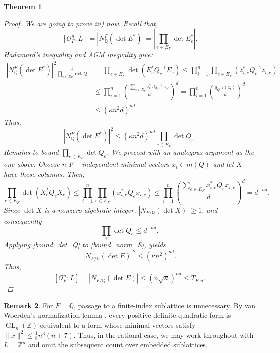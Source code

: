\documentclass[11pt,a4paper,twoside]{amsart}
\theoremstyle{plain}
\newtheorem{theorem}{\bfseries Theorem}[section]
\theoremstyle{definition}
\newtheorem{remark}[theorem]{\bfseries Remark}
\newcommand{\rint}[0]{\mathcal{O}_F}
\renewcommand{\leq}{\leqslant}
\renewcommand{\geq}{\geqslant}
\begin{document}
\begin{theorem}
\begin{proof}
We are going to prove iii) now. Recall that,
$$[\rint^n:L] = |N_{\mathbb{Q}}^F( \det E^*)| = \left|\prod_{e\in E_F} \det E_e^*\right|.$$
Hadamard's inequality and AGM inequality give:
\begin{align*}
    |N_{\mathbb{Q}}^F( \det E^*)|^2\frac{1}{\prod_{e\in E_F} \det Q} &= \prod_{e\in E_F} \det(E_e^*Q^{-1}_eE_e) \leq \prod_{i=1}^n\prod_{e\in E_F}(z_{i,e}^*Q^{-1}_ez_{i,e})\\
    &\leq \prod_{i = 1}^n \left(\frac{\sum_{e\in E_F} z_{i,e}^*Q^{-1}_ez_{i,e}}{d}\right)^d = \prod_{i=1}^n \left(\frac{q_{Q^{-1}}(z_i)}{d}\right)^d\\
    &\leq (\kappa n^2d)^{nd} 
\end{align*}
Thus,
\begin{equation}
\label{bound_norm_E}
    |N_{\mathbb{Q}}^F( \det E^*)|^2\leq (\kappa n^2d)^{nd} \prod_{e\in E_F} \det Q_e. 
\end{equation}
Remains to bound $\prod_{e\in E_F} \det Q_e$. We proceed with an analogous argument as the one above. Choose $n$ $F-$independent minimal vectors $x_i\in m(Q)$ and let $X$ have these columns. Then,
$$\prod_{e\in E_F}\det(X_e^*Q_eX_e)\leq\prod_{i=1}^n\prod_{e\in E_F}(x_{i,e}^*Q_ex_{i,e})\leq\prod_{i=1}^n\left(\frac{\sum_{e\in E_F}x_{i,e}^*Q_ex_{i,e}}{d}\right)^d=d^{-nd}.$$
Since $\det X$ is a nonzero algebraic integer, $|N_{F/\mathbb{Q}} (\det X)|\geq1$, and consequently
\begin{equation}
\label{bound_det_Q}
    \prod_e\det Q_e\leq d^{-nd}.
\end{equation}
Applying \eqref{bound_det_Q} to \eqref{bound_norm_E}, yields
 $$|N_{F/\mathbb{Q}} (\det E)|^2\leq(\kappa n^2)^{nd}.$$
Thus,
$$[\rint^n:L]=|N_{F/\mathbb{Q}} (\det E)|\leq(n\sqrt\kappa)^{nd}\leq T_{F,n}.$$
\end{proof}
\end{theorem}

\begin{remark}
For $F=\mathbb Q$, passage to a finite-index sublattice is unnecessary. By van Woerden's normalization lemma \cite[Lemma~3.3]{woerden}, every positive-definite quadratic form is $\operatorname{GL}_n(\mathbb Z)$-equivalent to a form whose minimal vectors satisfy $\|x\|^2\leq\frac{1}{8}n^3(n+7)$. Thus, in the rational case, we may work throughout with $L=\mathbb Z^n$ and omit the subsequent count over embedded sublattices.
\end{remark}
\end{document}

